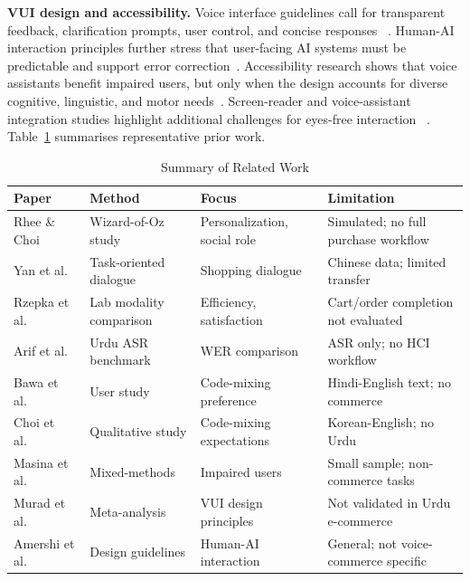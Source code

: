 \documentclass[conference]{IEEEtran}
\begin{document}
\textbf{VUI design and accessibility.}
Voice interface guidelines call for transparent feedback,
clarification prompts, user control, and concise responses~%
\cite{ross2004vui,murad2023guidelines,park2024voice}. Human-AI
interaction principles further stress that user-facing AI systems must
be predictable and support error correction~\cite{amershi2019guidelines}.
Accessibility research shows that voice assistants benefit impaired
users, but only when the design accounts for diverse cognitive,
linguistic, and motor needs~\cite{masina2020accessibility,doke2024emergent}.
Screen-reader and voice-assistant integration studies highlight
additional challenges for eyes-free interaction~%
\cite{vtyurina2017conversational}.
Table~\ref{tab:related} summarises representative prior work.

\begin{table}[t]
\caption{Summary of Related Work}
\label{tab:related}
\centering
\renewcommand{\arraystretch}{1.15}
\begin{tabular}{p{} p{} p{} p{}}
\toprule
\textbf{Paper} & \textbf{Method} & \textbf{Focus} & \textbf{Limitation} \\
\midrule
Rhee \& Choi~\cite{rhee2020voice}        & Wizard-of-Oz study      & Personalization, social role  & Simulated; no full purchase workflow \\
Yan et al.~\cite{yan2017shopping}         & Task-oriented dialogue  & Shopping dialogue             & Chinese data; limited transfer \\
Rzepka et al.~\cite{rzepka2022voice}      & Lab modality comparison & Efficiency, satisfaction      & Cart/order completion not evaluated \\
Arif et al.~\cite{arif2025wer}            & Urdu ASR benchmark      & WER comparison                & ASR only; no HCI workflow \\
Bawa et al.~\cite{bawa2020codemix}        & User study              & Code-mixing preference        & Hindi-English text; no commerce \\
Choi et al.~\cite{choi2023multilingual}   & Qualitative study       & Code-mixing expectations      & Korean-English; no Urdu \\
Masina et al.~\cite{masina2020accessibility} & Mixed-methods        & Impaired users                & Small sample; non-commerce tasks \\
Murad et al.~\cite{murad2023guidelines}   & Meta-analysis           & VUI design principles         & Not validated in Urdu e-commerce \\
Amershi et al.~\cite{amershi2019guidelines} & Design guidelines    & Human-AI interaction          & General; not voice-commerce specific \\
\bottomrule
\end{tabular}
\end{table}
\end{document}
